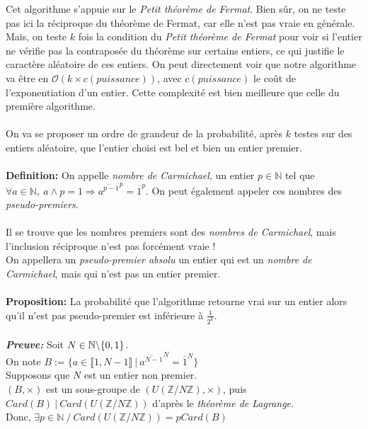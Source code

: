 \documentclass[12 pt]{article}
\begin{document}
Cet algorithme s'appuie sur le \textit{Petit théorème de Fermat}. Bien sûr, on ne teste pas ici la réciproque du théorème de Fermat, car elle n'est pas vraie en générale. Mais, on teste $k$ fois la condition du \textit{Petit théorème de Fermat} pour voir si l'entier ne vérifie pas la contraposée du théorème sur certains entiers, ce qui justifie le caractère aléatoire de ces entiers. On peut directement voir que notre algorithme va être en $\mathcal{O}(k \times c(puissance))$, avec $c(puissance)$ le coût de l'exponentiation d'un entier. Cette complexité est bien meilleure que celle du première algorithme. 
\\\\
On va se proposer un ordre de grandeur de la probabilité, après $k$ testes sur des entiers aléatoire, que l'entier choisi est bel et bien un entier premier.
\\
\\
\textbf{Definition:} On appelle \textit{nombre de Carmichael}, un entier $p \in \mathbb{N}$ tel que $\forall a \in \mathbb{N}, ~ a \wedge p = 1 \Rightarrow \overline{a^{p-1}}^p = \overline{1}^p$. On peut également appeler ces nombres des \textit{pseudo-premiers}.
\\\\
Il se trouve que les nombres premiers sont des \textit{nombres de Carmichael}, mais l'inclusion réciproque n'est pas forcément vraie !
\\
On appellera un \textit{pseudo-premier absolu} un entier qui est un \textit{nombre de Carmichael}, mais qui n'est pas un entier premier.
\\\\
\textbf{Proposition:} La probabilité que l'algorithme retourne vrai sur un entier alors qu'il n'est pas pseudo-premier est inférieure à $\frac{1}{2^k}$.\\\\
\textit{\textbf{Preuve:}} Soit $N \in \mathbb{N} \symbol{92} \{0, 1\}$.\\
On note $B := \{a \in \llbracket 1, N-1 \rrbracket ~ | ~ \overline{a ^ {N-1}}^N = \overline{1}^N\}$\\
Supposons que $N$ est un entier non premier.\\
$(B, \times)$ est un sous-groupe de $(U(\mathbb{Z} / N \mathbb{Z}), \times)$, puis $Card(B)~|~Card(U(\mathbb{Z} / N \mathbb{Z}))$ d'après le \textit{théorème de Lagrange}.\\
Donc, $\exists p \in \mathbb{N} ~ / ~ Card(U(\mathbb{Z} / N \mathbb{Z})) = p Card(B)$\\
\end{document}
